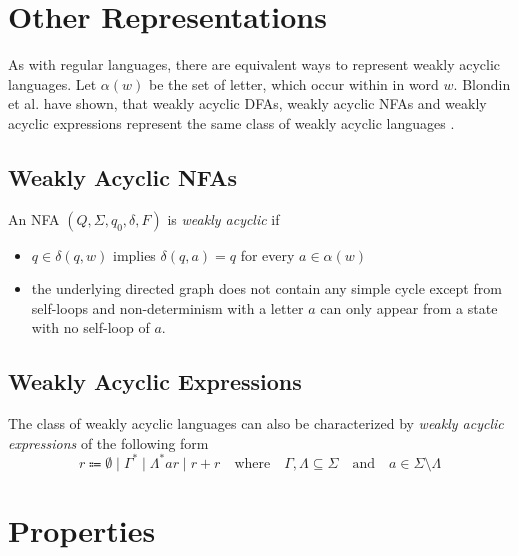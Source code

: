 \section{Other Representations}

As with regular languages, there are equivalent ways to represent weakly acyclic languages. Let $\alpha(w)$ be the set of letter, which occur within in word $w$. 
Blondin et al. have shown, that weakly acyclic DFAs, weakly acyclic NFAs and weakly acyclic expressions represent the same class of weakly acyclic languages \cite{blondin_24}. 



\subsection{Weakly Acyclic NFAs}
An NFA $(Q, \Sigma, q_{0},\delta,F)$ is \textit{weakly acyclic} if 
\begin{itemize}[--,noitemsep]
	\item $q \in \delta(q,w)$ implies $\delta(q,a) = {q}$ for every $a \in \alpha(w)$
	\item the underlying directed graph does not contain any simple cycle except from self-loops and non-determinism with a letter $a$ can only appear from a state with no self-loop of $a$.
\end{itemize}

\subsection{Weakly Acyclic Expressions}\label{sec:weakly_acyclic_regex}
The class of weakly acyclic languages can also be characterized by \textit{weakly acyclic expressions} of the following form
\begin{equation*}
r \Coloneqq \emptyset \mid \Gamma^{*} \mid \Lambda^{*} a r \mid r + r \quad \text{where} \quad  \Gamma, \Lambda \subseteq \Sigma \quad \textrm{and} \quad a \in \Sigma \setminus \Lambda
\end{equation*}


\section{Properties}
